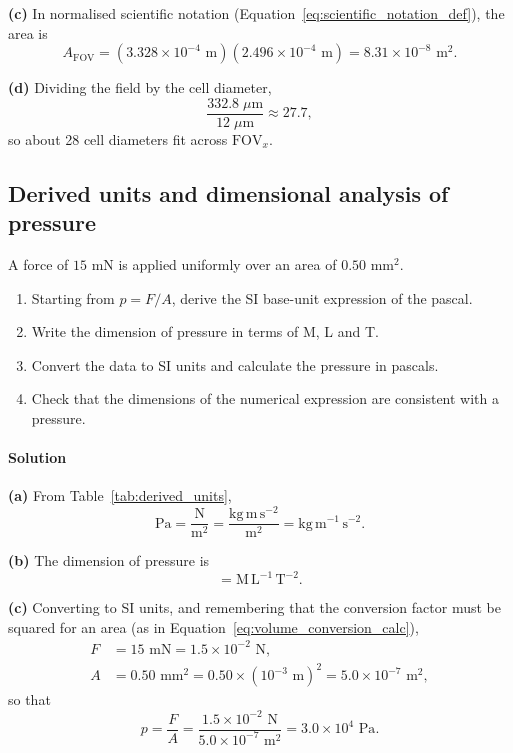 \textbf{(c)} In normalised scientific notation (Equation~\eqref{eq:scientific_notation_def}), the area is
\begin{equation*}
A_{\text{FOV}} = (3.328 \times 10^{-4}\text{ m})(2.496 \times 10^{-4}\text{ m}) = 8.31 \times 10^{-8}\text{ m}^2.
\end{equation*}

\textbf{(d)} Dividing the field by the cell diameter,
\begin{equation*}
\frac{332.8\;\mu\text{m}}{12\;\mu\text{m}} \approx 27.7,
\end{equation*}
so about 28 cell diameters fit across $\text{FOV}_x$.

\subsection{Derived units and dimensional analysis of pressure}
\label{ex:pressure}

A force of $15\text{ mN}$ is applied uniformly over an area of $0.50\text{ mm}^2$.
\begin{enumerate}[label=(\alph*)]
    \item Starting from $p = F/A$, derive the SI base-unit expression of the pascal.
    \item Write the dimension of pressure in terms of M, L and T.
    \item Convert the data to SI units and calculate the pressure in pascals.
    \item Check that the dimensions of the numerical expression are consistent with a pressure.
\end{enumerate}

\paragraph{Solution} \textbf{(a)} From Table~\ref{tab:derived_units},
\begin{equation*}
\text{Pa} = \frac{\text{N}}{\text{m}^2} = \frac{\text{kg}\,\text{m}\,\text{s}^{-2}}{\text{m}^2} = \text{kg}\,\text{m}^{-1}\,\text{s}^{-2}.
\end{equation*}

\textbf{(b)} The dimension of pressure is
\begin{equation*}
[p] = \text{M}\,\text{L}^{-1}\,\text{T}^{-2}.
\end{equation*}

\textbf{(c)} Converting to SI units, and remembering that the conversion factor must be squared for an area (as in Equation~\eqref{eq:volume_conversion_calc}),
\begin{align*}
F &= 15\text{ mN} = 1.5 \times 10^{-2}\text{ N}, \\
A &= 0.50\text{ mm}^2 = 0.50 \times (10^{-3}\text{ m})^2 = 5.0 \times 10^{-7}\text{ m}^2,
\end{align*}
so that
\begin{equation*}
p = \frac{F}{A} = \frac{1.5 \times 10^{-2}\text{ N}}{5.0 \times 10^{-7}\text{ m}^2} = 3.0 \times 10^4\text{ Pa}.
\end{equation*}

